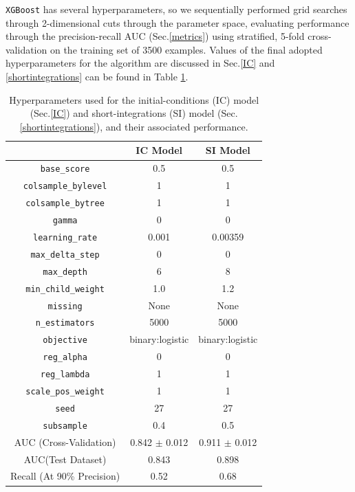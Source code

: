 {\tt XGBoost} has several hyperparameters, so we sequentially performed grid searches through 2-dimensional cuts through the parameter space, evaluating performance through the precision-recall AUC (Sec.\:\ref{metrics}) using stratified, 5-fold cross-validation on the training set of 3500 examples.
Values of the final adopted hyperparameters for the algorithm are discussed in Sec.\:\ref{IC} and \ref{shortintegrations} can be found in Table \ref{hyper}.

\begin{table}[h]
\begin{center}
\caption{Hyperparameters used for the initial-conditions (IC) model (Sec.\:\ref{IC}) and short-integrations (SI) model (Sec.\:\ref{shortintegrations}), and their associated performance. \label{hyper}}
\begin{tabular}{ c|c|c}
 	& IC Model & SI Model \\
  \hline \hline			

  {\tt base\_score} & 0.5 & 0.5\\
  {\tt colsample\_bylevel} & 1 & 1\\
  {\tt colsample\_bytree} & 1 & 1\\
  {\tt gamma} & 0 & 0\\
  {\tt learning\_rate} & 0.001 & 0.00359 \\
  {\tt max\_delta\_step} & 0 & 0 \\
  {\tt max\_depth} & 6 & 8 \\
  {\tt min\_child\_weight} & 1.0 & 1.2 \\
  {\tt missing} & None & None \\
  {\tt n\_estimators} & 5000 & 5000 \\
  {\tt objective} & binary:logistic & binary:logistic\\
  {\tt reg\_alpha} & 0 & 0 \\
  {\tt reg\_lambda} & 1 & 1 \\
  {\tt scale\_pos\_weight} & 1 & 1\\
  {\tt seed} & 27 & 27 \\
  {\tt subsample} & 0.4 & 0.5\\
  \hline \hline
  AUC (Cross-Validation) & 0.842 $\pm$ 0.012 & 0.911 $\pm$ 0.012\\
  AUC(Test Dataset) & 0.843 & 0.898 \\
  Recall (At 90\% Precision) & 0.52 & 0.68\\
    \hline  
\end{tabular}
\end{center}
\end{table}

